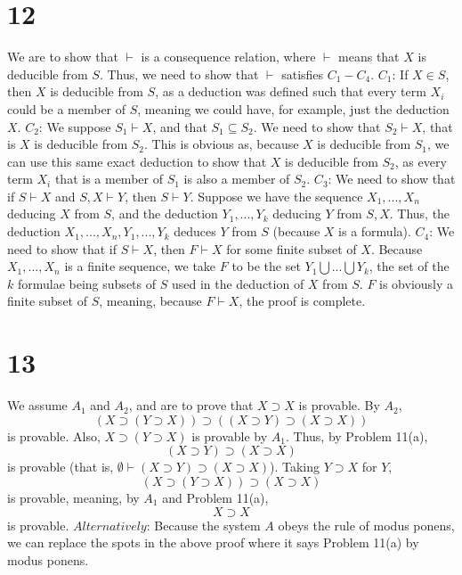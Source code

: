 \documentclass{article}
\let\oldemptyset\emptyset
\theoremstyle{definition}
\begin{document}
\section*{12}
We are to show that $\vdash$ is a consequence relation, where $\vdash$ means that $X$ is deducible from $S$. Thus, we need to show that $\vdash$ 
satisfies $C_1-C_4$.\newline
$C_1$: If $X\in S$, then $X$ is deducible from $S$, as a deduction was defined such that every term $X_i$ could be a member of $S$, meaning 
we could have, for example, just the deduction $X$.\newline
$C_2$: We suppose $S_1\vdash X$, and that $S_1\subseteq S_2$. We need to show that $S_2\vdash X$, that is $X$ is deducible from $S_2$. This is obvious
as, because $X$ is deducible from $S_1$, we can use this same exact deduction to show that $X$ is deducible from $S_2$, as every term $X_i$ that is 
a member of $S_1$ is also a member of $S_2$.\newline
$C_3$: We need to show that if $S\vdash X$ and $S,X\vdash Y$, then $S\vdash Y$. Suppose we have the sequence $X_1,...,X_n$ deducing $X$ from $S$, 
and the deduction $Y_1,...,Y_k$ deducing $Y$ from $S,X$. Thus, the deduction $X_1,...,X_n,Y_1,...,Y_k$ deduces $Y$ from $S$ (because $X$ is a formula).
\newline
$C_4$: We need to show that if $S\vdash X$, then $F\vdash X$ for some finite subset of $X$. Because $X_1,...,X_n$ is a finite sequence, 
we take $F$ to be the set $Y_1\bigcup ...\bigcup Y_k$, the set of the $k$ formulae being subsets of $S$ 
used in the deduction of $X$ from $S$. $F$ is obviously a finite 
subset of $S$, meaning, because $F\vdash X$, the proof is complete. 

\section*{13}
We assume $A_1$ and $A_2$, and are to prove that $X\supset X$ is provable. By $A_2$, 
\[ (X\supset (Y\supset X))\supset ((X\supset Y)\supset (X\supset X)) \] is provable. Also, $X\supset (Y\supset X)$ is provable by $A_1$. 
Thus, by Problem 11(a), 
\[ (X\supset Y)\supset (X\supset X) \] is provable (that is, $\oldemptyset\vdash (X\supset Y)\supset (X\supset X)$). Taking $Y\supset X$ for $Y$, 
\[ (X\supset (Y\supset X))\supset (X\supset X) \] is provable, meaning, by $A_1$ and Problem 11(a), 
\[ X\supset X \] is provable.\newline 
$Alternatively$: Because the system $A$ obeys the rule of modus ponens, we can replace the spots in the above proof where it says Problem 11(a) by 
modus ponens.
\end{document}
